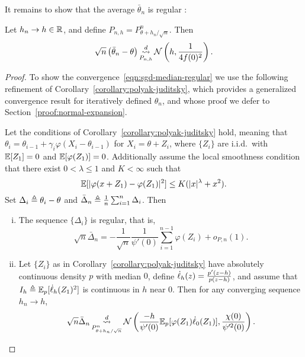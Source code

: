 It remains to show that the average $\bar{\theta}_n$ is regular :
\begin{lemma}
  \label{lemma:sgd-median-regular}
  Let $h_n \to h \in \mathbb{R}$, and define $P_{n,h} = P_{\theta + h_n / \sqrt{n}}^n$.
  Then 
  \begin{align}
    \label{eqn:sgd-median-regular}
    {\color{black} {
    \sqrt{n}\left( \bar{\theta}_n - \theta \right)
    \mathop{\stackrel{d}{\rightsquigarrow}}_{P_{n,h}}
    \mathcal{N}\left( h,\frac{1}{4 f(0)^2}\right).
    }}
  \end{align}
\end{lemma}
\begin{proof}
  To show the convergence~\eqref{eqn:sgd-median-regular} we use the
  following refinement of Corollary~\ref{corollary:polyak-juditsky}, which
  provides a generalized convergence result for iteratively defined
  $\theta_n$, and whose
  proof we defer to Section~\ref{proof:normal-expansion}.
  \begin{corollary}
    \label{corollary:normal-expansion}
    Let the conditions of Corollary~\ref{corollary:polyak-juditsky} hold,
    meaning that $\theta_i = \theta_{i-1} + \gamma_i \varphi(X_i -
    \theta_{i-1})$ for $X_i = \theta + Z_i$, where $\{Z_i\}$ are i.i.d.\ with
   $\mathbb{E}[Z_1]=0$ and  $\mathbb{E}[\varphi(Z_1)] = 0$. Additionally assume the local smoothness
    condition that there exist $0 < \lambda \le 1$ and $K < \infty$ such
    that
    \begin{equation}
      \label{eqn:additional-local-smooth} 
      \mathbb{E}[|\varphi(x + Z_1) - \varphi(Z_1)|^2]
      \le K (|x|^\lambda + x^2).
    \end{equation}
    Set $\Delta_i \triangleq \theta_i - \theta$ and $\bar{\Delta}_n \triangleq \frac{1}{n}
    \sum_{i=1}^n \Delta_i$. Then
    \begin{enumerate}[(i)]
    \item \label{item:regularity}
      The sequence $\{\Delta_i\}$ is regular, that is,
      \begin{equation}
        \sqrt{n} \bar{\Delta}_n
        = -\frac{1}{\sqrt{n}} \frac{1}{\psi'(0)} \sum_{i=1}^{n-1} \varphi(Z_i)
        + o_{P,n}(1).
        \label{eq:normal_expansion_lem}
      \end{equation}
    \item \label{item:apply-le-cam} Let $\{Z_i\}$ as in
      Corollary~\ref{corollary:polyak-juditsky} have absolutely continuous
      density $p$ with median $0$, define $\dot{\ell}_h(z) = \frac{p'(z - h)}{p(z
        - h)}$, and assume that $I_h \triangleq \mathbb{E}_p[\dot{\ell}_h(Z_1)^2]$ is
      continuous in $h$ near 0.  Then for any converging sequence $h_n \to h$,
      \begin{equation*}
        \sqrt{n} \bar{\Delta}_n
        \mathop{\stackrel{d}{\rightsquigarrow}}_{P_{\theta + h_n/\sqrt{n}}^n}
        \mathcal{N}\left( \frac{-h}{\psi'(0)} \mathbb{E}_p[\varphi(Z_1) \dot{\ell}_0(Z_1)],
        \frac{\chi(0)}{\psi'^2(0)} \right).
      \end{equation*}
    \end{enumerate}
  \end{corollary}


\end{proof}
